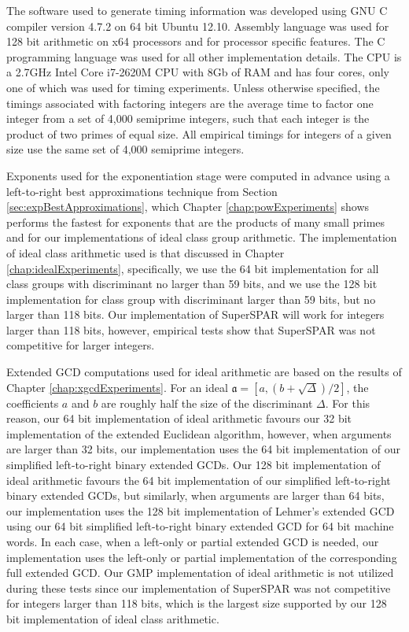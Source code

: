 \documentclass{ucalgthes1}
\theoremstyle{definition}
\newcommand{\ideal}{\mathfrak}
\newcommand{\compiler}{GNU C compiler version 4.7.2}
\newcommand{\cpu}{2.7GHz Intel Core i7-2620M CPU}
\begin{document}
The software used to generate timing information was developed using \compiler{} on 64 bit Ubuntu 12.10.  Assembly language was used for 128 bit arithmetic on x64 processors and for processor specific features.  The C programming language was used for all other implementation details.  The CPU is a \cpu{} with 8Gb of RAM and has four cores, only one of which was used for timing experiments.  Unless otherwise specified, the timings associated with factoring integers are the average time to factor one integer from a set of 4,000 semiprime integers, such that each integer is the product of two primes of equal size.  All empirical timings for integers of a given size use the same set of 4,000 semiprime integers.

Exponents used for the exponentiation stage were computed in advance using a left-to-right best approximations technique from Section \ref{sec:expBestApproximations}, which Chapter \ref{chap:powExperiments} shows performs the fastest for exponents that are the products of many small primes and for our implementations of ideal class group arithmetic.  The implementation of ideal class arithmetic used is that discussed in Chapter \ref{chap:idealExperiments}, specifically, we use the 64 bit implementation for all class groups with discriminant no larger than 59 bits, and we use the 128 bit implementation for class group with discriminant larger than 59 bits, but no larger than 118 bits.  Our implementation of SuperSPAR will work for integers larger than 118 bits, however, empirical tests show that SuperSPAR was not competitive for larger integers.

Extended GCD computations used for ideal arithmetic are based on the results of Chapter \ref{chap:xgcdExperiments}.  For an ideal $\ideal a = [a, (b + \sqrt\Delta)/2]$, the coefficients $a$ and $b$ are roughly half the size of the discriminant $\Delta$.  For this reason, our 64 bit implementation of ideal arithmetic favours our 32 bit implementation of the extended Euclidean algorithm, however, when arguments are larger than 32 bits, our implementation uses the 64 bit implementation of our simplified left-to-right binary extended GCDs.  Our 128 bit implementation of ideal arithmetic favours the 64 bit implementation of our simplified left-to-right binary extended GCDs, but similarly, when arguments are larger than 64 bits, our implementation uses the 128 bit implementation of Lehmer's extended GCD using our 64 bit simplified left-to-right binary extended GCD for 64 bit machine words.   In each case, when a left-only or partial extended GCD is needed, our implementation uses the left-only or partial implementation of the corresponding full extended GCD.  Our GMP implementation of ideal arithmetic is not utilized during these tests since our implementation of SuperSPAR was not competitive for integers larger than 118 bits, which is the largest size supported by our 128 bit implementation of ideal class arithmetic.
\end{document}

